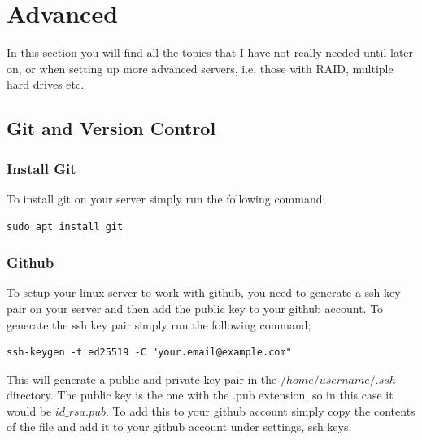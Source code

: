 \chapter{Advanced}
\label{chp:adv_basic}


In this section you will find all the topics that I have not really needed until later on, or when setting up more advanced servers, i.e. those with RAID, multiple hard drives etc.

\section{Git and Version Control}
\label{sec:git}


\subsection{Install Git}
\label{ssec:git_install}

To install git on your server simply run the following command;

\begin{lstlisting}
sudo apt install git
\end{lstlisting}

\subsection{Github}
\label{ssec:github}

To setup your linux server to work with github, you need to generate a ssh key pair on your server and then add the public key to your github account.  To generate the ssh key pair simply run the following command;

\begin{lstlisting}
ssh-keygen -t ed25519 -C "your.email@example.com"
\end{lstlisting}

This will generate a public and private key pair in the $/home/username/.ssh$ directory.  The public key is the one with the .pub extension, so in this case it would be $id\_rsa.pub$.  To add this to your github account simply copy the contents of the file and add it to your github account under settings, ssh keys.

